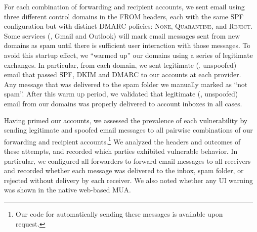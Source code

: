 For each combination of forwarding and recipient accounts, we sent
email using three different control domains in the FROM headers, each
with the same SPF configuration but with distinct DMARC policies:
\textsc{None}, \textsc{Quarantine}, and \textsc{Reject}.
%
Some services (\eg, Gmail and Outlook) will mark email messages sent
from new domains as spam until there is sufficient user interaction
with those messages.  To avoid this startup effect, we ``warmed up''
our domains using a series of legitimate exchanges.  In particular,
from each domain, we sent legitimate (\ie, unspoofed) email that
passed SPF, DKIM and DMARC to our accounts at each provider.  Any
message that was delivered to the spam folder we manually marked as
``not spam''.  After this warm up period, we validated that legitimate
(\ie, unspoofed) email from our domains was properly delivered to
account inboxes in all cases.

Having primed our accounts, we assessed the prevalence of each vulnerability by
sending legitimate and spoofed email messages to all
pairwise combinations of our forwarding and recipient accounts.\footnote{Our code for automatically sending these messages is available upon request.}  We
analyzed the headers and outcomes of these attempts, and recorded
which parties exhibited vulnerable behavior.  In particular, we
configured all forwarders to forward email messages to all receivers
and recorded whether each message was delivered to the inbox, spam
folder, or rejected without delivery by each receiver.  We also noted
whether any UI warning was shown in the native web-based MUA. 







